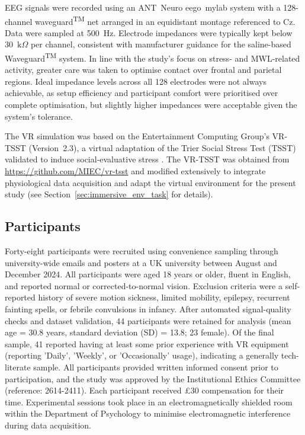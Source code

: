 \documentclass[lettersize,journal]{IEEEtran}
\begin{document}
EEG signals were recorded using an ANT~Neuro eego~mylab system with a 128-channel waveguard\textsuperscript{TM} net arranged in an equidistant montage referenced to Cz. Data were sampled at 500~Hz. Electrode impedances were typically kept below 30~\(\mathrm{k}\Omega\) per channel, consistent with manufacturer guidance for the saline-based Waveguard\textsuperscript{TM} system. In line with the study’s focus on stress- and MWL-related activity, greater care was taken to optimise contact over frontal and parietal regions. Ideal impedance levels across all 128 electrodes were not always achievable, as setup efficiency and participant comfort were prioritised over complete optimisation, but slightly higher impedances were acceptable given the system’s tolerance. 

The VR simulation was based on the Entertainment Computing Group’s VR-TSST (Version~2.3), a virtual adaptation of the Trier Social Stress Test (TSST) validated to induce social-evaluative stress \cite{liszioRelaxationDistractionFun2021}. The VR-TSST was obtained from \url{https://github.com/MIEC/vr-tsst} and modified extensively to integrate physiological data acquisition and adapt the virtual environment for the present study (see Section~\ref{sec:immersive_env_task} for details).

\subsection{Participants}
\label{sec:participants}
Forty-eight participants were recruited using convenience sampling through university-wide emails and posters at a UK university between August and December 2024. 
All participants were aged 18 years or older, fluent in English, and reported normal or corrected-to-normal vision. 
Exclusion criteria were a self-reported history of severe motion sickness, limited mobility, epilepsy, recurrent fainting spells, or febrile convulsions in infancy. 
After automated signal-quality checks and dataset validation, 44 participants were retained for analysis (mean age = 30.8 years, standard deviation (SD) = 13.8; 23 female). 
Of the final sample, 41 reported having at least some prior experience with VR equipment (reporting 'Daily', 'Weekly', or 'Occasionally' usage), indicating a generally tech-literate sample.
All participants provided written informed consent prior to participation, and the study was approved by the Institutional Ethics Committee (reference: 2614-2411). 
Each participant received £30 compensation for their time. Experimental sessions took place in an electromagnetically shielded room within the Department of Psychology to minimise electromagnetic interference during data acquisition.
\end{document}
